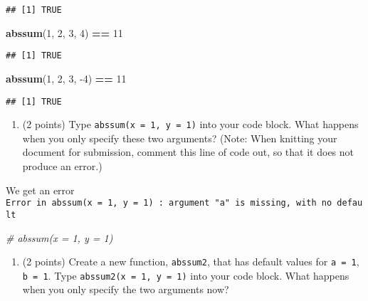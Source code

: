 \documentclass[]{article}
\newenvironment{Shaded}{\begin{snugshade}}{\end{snugshade}}
\newcommand{\CommentTok}[1]{\textcolor[rgb]{0.56,0.35,0.01}{\textit{#1}}}
\newcommand{\DecValTok}[1]{\textcolor[rgb]{0.00,0.00,0.81}{#1}}
\newcommand{\KeywordTok}[1]{\textcolor[rgb]{0.13,0.29,0.53}{\textbf{#1}}}
\newcommand{\NormalTok}[1]{#1}
\newcommand{\OperatorTok}[1]{\textcolor[rgb]{0.81,0.36,0.00}{\textbf{#1}}}
\newcommand{\StringTok}[1]{\textcolor[rgb]{0.31,0.60,0.02}{#1}}
\providecommand{\tightlist}{%
  \setlength{\itemsep}{0pt}\setlength{\parskip}{0pt}}
\begin{document}
\begin{verbatim}
## [1] TRUE
\end{verbatim}

\begin{Shaded}
\begin{Highlighting}[]
\KeywordTok{abssum}\NormalTok{(}\DecValTok{1}\NormalTok{, }\DecValTok{2}\NormalTok{, }\DecValTok{3}\NormalTok{, }\DecValTok{4}\NormalTok{) }\OperatorTok{==}\StringTok{ }\DecValTok{11}
\end{Highlighting}
\end{Shaded}

\begin{verbatim}
## [1] TRUE
\end{verbatim}

\begin{Shaded}
\begin{Highlighting}[]
\KeywordTok{abssum}\NormalTok{(}\DecValTok{1}\NormalTok{, }\DecValTok{2}\NormalTok{, }\DecValTok{3}\NormalTok{, }\DecValTok{-4}\NormalTok{) }\OperatorTok{==}\StringTok{ }\DecValTok{11}
\end{Highlighting}
\end{Shaded}

\begin{verbatim}
## [1] TRUE
\end{verbatim}

\begin{enumerate}
\def\labelenumi{\alph{enumi}.}
\setcounter{enumi}{2}
\tightlist
\item
  (2 points) Type \texttt{abssum(x\ =\ 1,\ y\ =\ 1)} into your code
  block. What happens when you only specify these two arguments? (Note:
  When knitting your document for submission, comment this line of code
  out, so that it does not produce an error.)
\end{enumerate}

We get an error
\texttt{Error\ in\ abssum(x\ =\ 1,\ y\ =\ 1)\ :\ argument\ "a"\ is\ missing,\ with\ no\ default}

\begin{Shaded}
\begin{Highlighting}[]
\CommentTok{# abssum(x = 1, y = 1)}
\end{Highlighting}
\end{Shaded}

\begin{enumerate}
\def\labelenumi{\alph{enumi}.}
\setcounter{enumi}{3}
\tightlist
\item
  (2 points) Create a new function, \texttt{abssum2}, that has default
  values for \texttt{a\ =\ 1}, \texttt{b\ =\ 1}. Type
  \texttt{abssum2(x\ =\ 1,\ y\ =\ 1)} into your code block. What happens
  when you only specify the two arguments now?
\end{enumerate}
\end{document}
